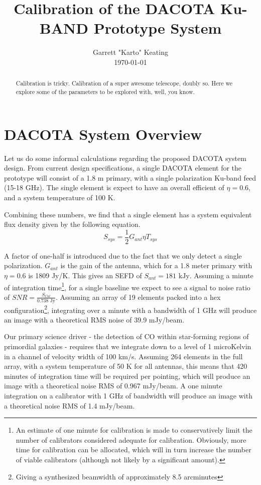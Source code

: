 \documentclass[preprint]{aastex}
\begin{document}
\title{Calibration of the DACOTA Ku-BAND Prototype System}
\author{Garrett "Karto" Keating \\ \today}

\begin{abstract} Calibration is tricky. Calibration of a super awesome telescope, doubly so. Here we explore some of the parameters to be explored with, well, you know.
\end{abstract}

\section{DACOTA System Overview}\label{secoverview}
Let us do some informal calculations regarding the proposed DACOTA system design. From current design specifications, a single DACOTA element for the prototype will consist of a 1.8 m primary, with a single polarization Ku-band feed (15-18 GHz). The single element is expect to have an overall efficient of $\eta=0.6$, and a system temperature of 100 K.

Combining these numbers, we find that a single element has a system equivalent flux density given by the following equation.
\begin{equation} \label{eqsefd}
S_{sys}=\frac{1}{2}G_{ant}{\eta}T_{sys}
\end{equation}

\noindent A factor of one-half is introduced due to the fact that we only detect a single polarization. $G_{ant}$ is the gain of the antenna, which for a 1.8 meter primary with $\eta=0.6$ is 1809 Jy/K. This gives an SEFD of $S_{ant}=181\text{ kJy}$. Assuming a minute of integration time\footnote{An estimate of one minute for calibration is made to conservatively limit the number of calibrators considered adequate for calibration. Obviously, more time for calibration can be allocated, which will in turn increase the number of viable calibrators (although not likely by a significant amount).}, for a single baseline we expect to see a signal to noise ratio of $SNR=\frac{S_{Cal}}{0.738\text{ Jy}}$. Assuming an array of 19 elements packed into a hex configuration\footnote{Giving a synthesized beamwidth of approximately 8.5 arcminutes}, integrating over a minute with a bandwidth of 1 GHz will produce an image with a theoretical RMS noise of 39.9 mJy/beam. 

Our primary science driver - the detection of CO within star-forming regions of primordial galaxies - requires that we integrate down to a level of 1 microKelvin in a channel of velocity width of 100 km/s. Assuming 264 elements in the full array, with a system temperature of 50 K for all antennas, this means that 420 minutes of integration time will be required per pointing, which will produce an image with a theoretical noise RMS of 0.967 mJy/beam. A one minute integration on a calibrator with 1 GHz of bandwidth will produce an image with a theoretical noise RMS of 1.4 mJy/beam.
\end{document}
